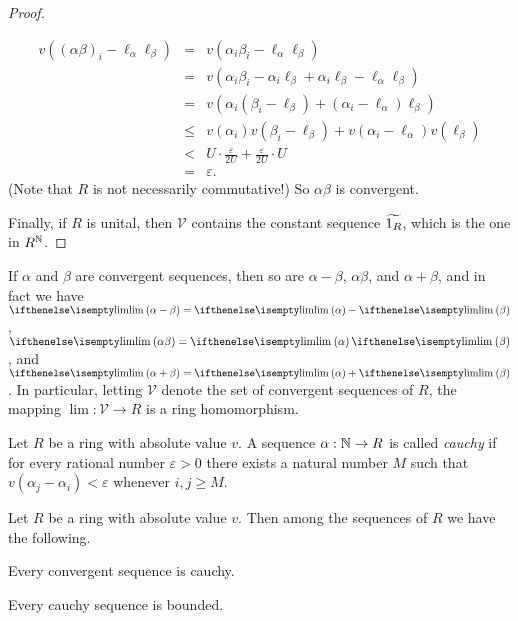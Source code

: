 \begin{proof}
\begin{inlineproplist}
\begin{eqnarray*}
v((\alpha\beta)_i - \ell_\alpha \ell_\beta)
 & = & v(\alpha_i\beta_i - \ell_\alpha \ell_\beta) \\
 & = & v(\alpha_i\beta_i - \alpha_i \ell_\beta + \alpha_i \ell_\beta - \ell_\alpha \ell_\beta) \\
 & = & v\left( \alpha_i(\beta_i - \ell_\beta) + (\alpha_i - \ell_\alpha)\ell_\beta \right) \\
 & \leq & v(\alpha_i)v(\beta_i - \ell_\beta) + v(\alpha_i - \ell_\alpha)v(\ell_\beta) \\
 & < & U \cdot \frac{\varepsilon}{2U} + \frac{\varepsilon}{2U} \cdot U \\
 & = & \varepsilon.
\end{eqnarray*}
(Note that \(R\) is not necessarily commutative!)
So \(\alpha\beta\) is convergent.
\end{inlineproplist}
Finally, if \(R\) is unital, then \(\mathcal{V}\) contains the constant sequence \(\widetilde{1_R}\), which is the one in \(R^{\mathbb{N}}\).
\end{proof}

\begin{cor}
If \(\alpha\) and \(\beta\) are convergent sequences, then so are \(\alpha - \beta\), \(\alpha \beta\), and \(\alpha + \beta\), and in fact we have \(\LIM{\alpha - \beta} = \LIM{\alpha} - \LIM{\beta}\), \(\LIM{\alpha\beta} = \LIM{\alpha}\LIM{\beta}\), and \(\LIM{\alpha + \beta} = \LIM{\alpha} + \LIM{\beta}\).
In particular, letting \(\mathcal{V}\) denote the set of convergent sequences of \(R\), the mapping \(\lim : \mathcal{V} \rightarrow R\) is a ring homomorphism.
\end{cor}

\begin{dfn}
Let \(R\) be a ring with absolute value \(v\).
A sequence \(\alpha : \mathbb{N} \rightarrow R\) is called \emph{cauchy} if for every rational number \(\varepsilon > 0\) there exists a natural number \(M\) such that \(v(\alpha_j - \alpha_i) < \varepsilon\) whenever \(i,j \geq M\).
\end{dfn}

\begin{prop} \label{prop:cauchy-seq-subset}
Let \(R\) be a ring with absolute value \(v\).
Then among the sequences of \(R\) we have the following.
\begin{proplist}
\item \label{prop:cauchy-seq-subset:convergent} Every convergent sequence is cauchy.
\item \label{prop:cauchy-seq-subset:bounded} Every cauchy sequence is bounded.
\end{proplist}
\end{prop}

